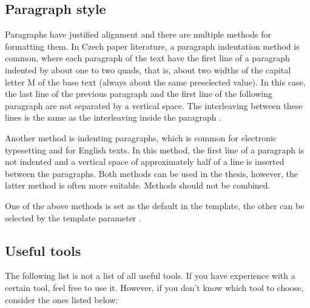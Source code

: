 \subsection*{Paragraph style}

Paragraphs have justified alignment and there are multiple methods for formatting them. In Czech paper literature, a paragraph indentation method is common, where each paragraph of the text have the first line of a paragraph indented by about one to two quads, that is, about two widths of the capital letter M of the base text (always about the same preselected value). In this case, the last line of the previous paragraph and the first line of the following paragraph are not separated by a vertical space. The interleaving between these lines is the same as the interleaving inside the paragraph \cite{fitWeb}.

Another method is indenting paragraphs, which is common for electronic typesetting and for English texts. In this method, the first line of a paragraph is not indented and a vertical space of approximately half of a line is inserted between the paragraphs. Both methods can be used in the thesis, however, the latter method is often more suitable. Methods should not be combined.

One of the above methods is set as the default in the template, the other can be selected by the template parameter .


\subsection*{Useful tools} 
\label{nastroje}

The following list is not a list of all useful tools. If you have experience with a certain tool, feel free to use it. However, if you don't know which tool to choose, consider the ones listed below:

